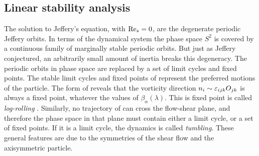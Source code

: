 \documentclass[thesis.tex]{subfiles}
\begin{document}
\subsection*{Linear stability analysis}

The solution to Jeffery's equation,  with $\textrm{Re}_s=0$, are the degenerate periodic Jeffery orbits. In terms of the dynamical system  the phase space $S^2$ is covered by a continuous family of marginally stable periodic orbits. But just as Jeffery conjectured, an arbitrarily small amount of inertia breaks this degeneracy. The periodic orbits in phase space are replaced by a set of limit cycles and fixed points. The stable limit cycles and fixed points of  represent the preferred motions of the particle. The form of  reveals that the vorticity direction $n_i \sim \varepsilon_{ijk}O_{jk}$ is always a fixed point, whatever the values of $\beta_\alpha(\lambda)$. This is fixed point is called \emph{log-rolling} . Similarly, no trajectory of  can cross the flow-shear plane, and therefore the phase space in that plane must contain either a limit cycle, or a set of fixed points. If it is a limit cycle, the dynamics is called \emph{tumbling}. These general features are due to the symmetries of the shear flow and the axisymmetric particle. 
\end{document}
